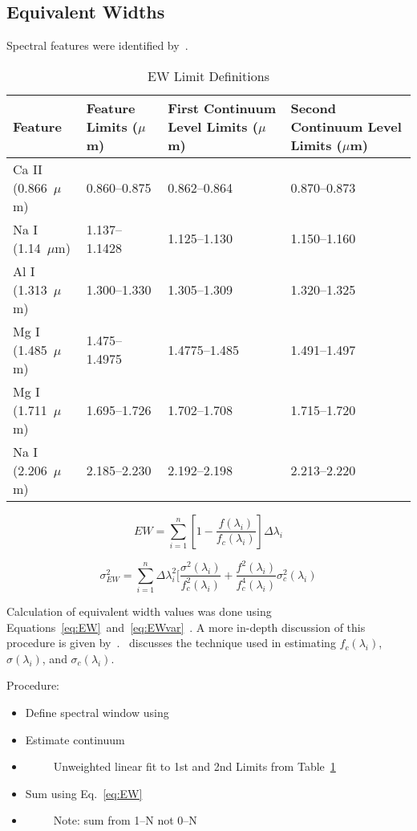 \subsection{Equivalent Widths}


Spectral features were identified by~\cite{Rayner_2009}.  

\begin{table}[H]
    \caption{EW Limit Definitions}
	\begin{tabular}{l|l|l|l}
	\label{tab:features}
		Feature & Feature Limits ($\mu$m) & First Continuum Level Limits ($\mu$m) & Second Continuum Level Limits ($\mu$m) \\ \hline
		Ca II (0.866~$\mu$m) & 0.860--0.875 & 0.862--0.864 & 0.870--0.873 \\
		Na I (1.14~$\mu$m) & 1.137--1.1428 & 1.125--1.130 & 1.150--1.160 \\
		Al I (1.313~$\mu$m) & 1.300--1.330 & 1.305--1.309 & 1.320--1.325 \\
		Mg I (1.485~$\mu$m) & 1.475--1.4975 & 1.4775--1.485 & 1.491--1.497 \\
		Mg I (1.711~$\mu$m) & 1.695--1.726 & 1.702--1.708 & 1.715--1.720 \\
		Na I (2.206~$\mu$m) & 2.185--2.230 & 2.192--2.198 & 2.213--2.220 \\
	\end{tabular}
\end{table}

\begin{equation}\label{eq:EW}
	EW = \sum_{i=1}^{n} [1 - \frac{f(\lambda_{i})}{f_{c}(\lambda_{i})}] \Delta\lambda_{i}
\end{equation}

\begin{equation}\label{eq:EWvar}
	\sigma_{EW}^{2} = \sum_{i=1}^{n} \Delta\lambda_{i}^{2} [\frac{\sigma^{2}(\lambda_{i})}{f_{c}^{2}(\lambda_{i})} + \frac{f^{2}(\lambda_{i})}{f_{c}^{4}(\lambda_{i})}\sigma_{c}^{2}(\lambda_{i})
\end{equation}


Calculation of equivalent width values was done using Equations~\ref{eq:EW}~and~\ref{eq:EWvar}~\cite{Cushing_2005}.  A more in-depth discussion of this procedure is given by~\cite{Cushing_2005}.  \cite{Sembach_1992}~discusses the technique used in estimating $f_{c}(\lambda_{i})$, $\sigma(\lambda_{i})$, and $\sigma_{c}(\lambda_{i})$.

Procedure:\\
\begin{itemize}
	\item{} Define spectral window using
	\item{} Estimate continuum
	\item{}~~~~~Unweighted linear fit to 1st and 2nd Limits from Table~\ref{tab:features}
	\item{} Sum using Eq.~\ref{eq:EW}
	\item{}~~~~~Note: sum from 1--N not 0--N
\end{itemize}




